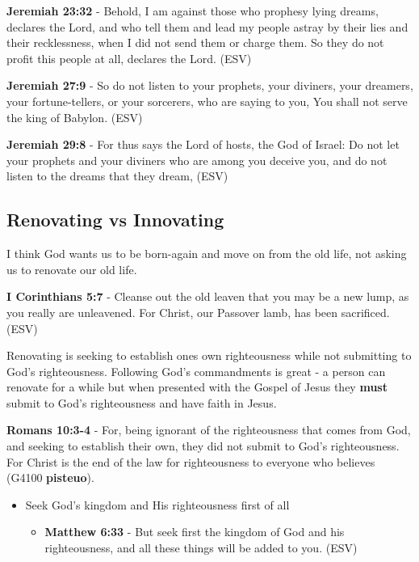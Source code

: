 \documentclass[11pt]{article}
\begin{document}
\textbf{Jeremiah 23:32} - Behold, I am against those who prophesy lying dreams, declares the Lord, and who tell them and lead my people astray by their lies and their recklessness, when I did not send them or charge them. So they do not profit this people at all, declares the Lord. (ESV)

\textbf{Jeremiah 27:9} - So do not listen to your prophets, your diviners, your dreamers, your fortune-tellers, or your sorcerers, who are saying to you, You shall not serve the king of Babylon. (ESV)

\textbf{Jeremiah 29:8} - For thus says the Lord of hosts, the God of Israel: Do not let your prophets and your diviners who are among you deceive you, and do not listen to the dreams that they dream, (ESV)

\subsection{Renovating vs Innovating}
\label{sec:org2c90d9c}
I think God wants us to be born-again and move on from the old life,
not asking us to renovate our old life.

\textbf{I Corinthians 5:7} - Cleanse out the old leaven that you may be a new lump, as you really are unleavened. For Christ, our Passover lamb, has been sacrificed. (ESV)

Renovating is seeking to establish ones own righteousness while not submitting to God's righteousness.
Following God's commandments is great - a person can renovate for a while but when presented with the Gospel of Jesus they \textbf{must} submit to God's righteousness and have faith in Jesus.

\textbf{Romans 10:3-4} - For, being ignorant of the righteousness that comes from God, and seeking to establish their own, they did not submit to God's righteousness. For Christ is the end of the law for righteousness to everyone who believes (G4100 \textbf{pisteuo}).

\begin{itemize}
\item Seek God's kingdom and His righteousness first of all
\begin{itemize}
\item \textbf{Matthew 6:33} - But seek first the kingdom of God and his righteousness, and all these things will be added to you. (ESV)
\end{itemize}
\end{itemize}
\end{document}
